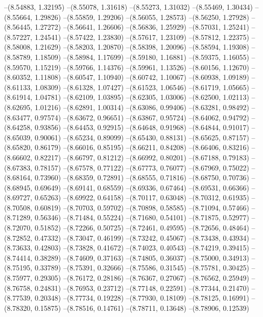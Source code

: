 --(8.54883, 1.32195)
--(8.55078, 1.31618)
--(8.55273, 1.31032)
--(8.55469, 1.30434)
--(8.55664, 1.29826)
--(8.55859, 1.29206)
--(8.56055, 1.28573)
--(8.56250, 1.27928)
--(8.56445, 1.27272)
--(8.56641, 1.26606)
--(8.56836, 1.25929)
--(8.57031, 1.25241)
--(8.57227, 1.24541)
--(8.57422, 1.23830)
--(8.57617, 1.23109)
--(8.57812, 1.22375)
--(8.58008, 1.21629)
--(8.58203, 1.20870)
--(8.58398, 1.20096)
--(8.58594, 1.19308)
--(8.58789, 1.18509)
--(8.58984, 1.17699)
--(8.59180, 1.16881)
--(8.59375, 1.16055)
--(8.59570, 1.15219)
--(8.59766, 1.14376)
--(8.59961, 1.13526)
--(8.60156, 1.12670)
--(8.60352, 1.11808)
--(8.60547, 1.10940)
--(8.60742, 1.10067)
--(8.60938, 1.09189)
--(8.61133, 1.08309)
--(8.61328, 1.07427)
--(8.61523, 1.06546)
--(8.61719, 1.05665)
--(8.61914, 1.04781)
--(8.62109, 1.03895)
--(8.62305, 1.03006)
--(8.62500, 1.02113)
--(8.62695, 1.01216)
--(8.62891, 1.00314)
--(8.63086, 0.99406)
--(8.63281, 0.98492)
--(8.63477, 0.97574)
--(8.63672, 0.96651)
--(8.63867, 0.95724)
--(8.64062, 0.94792)
--(8.64258, 0.93856)
--(8.64453, 0.92915)
--(8.64648, 0.91968)
--(8.64844, 0.91017)
--(8.65039, 0.90061)
--(8.65234, 0.89099)
--(8.65430, 0.88131)
--(8.65625, 0.87157)
--(8.65820, 0.86179)
--(8.66016, 0.85195)
--(8.66211, 0.84208)
--(8.66406, 0.83216)
--(8.66602, 0.82217)
--(8.66797, 0.81212)
--(8.66992, 0.80201)
--(8.67188, 0.79183)
--(8.67383, 0.78157)
--(8.67578, 0.77122)
--(8.67773, 0.76077)
--(8.67969, 0.75022)
--(8.68164, 0.73960)
--(8.68359, 0.72891)
--(8.68555, 0.71816)
--(8.68750, 0.70736)
--(8.68945, 0.69649)
--(8.69141, 0.68559)
--(8.69336, 0.67464)
--(8.69531, 0.66366)
--(8.69727, 0.65263)
--(8.69922, 0.64158)
--(8.70117, 0.63048)
--(8.70312, 0.61935)
--(8.70508, 0.60819)
--(8.70703, 0.59702)
--(8.70898, 0.58585)
--(8.71094, 0.57466)
--(8.71289, 0.56346)
--(8.71484, 0.55224)
--(8.71680, 0.54101)
--(8.71875, 0.52977)
--(8.72070, 0.51852)
--(8.72266, 0.50725)
--(8.72461, 0.49595)
--(8.72656, 0.48464)
--(8.72852, 0.47332)
--(8.73047, 0.46199)
--(8.73242, 0.45067)
--(8.73438, 0.43934)
--(8.73633, 0.42803)
--(8.73828, 0.41672)
--(8.74023, 0.40543)
--(8.74219, 0.39415)
--(8.74414, 0.38289)
--(8.74609, 0.37163)
--(8.74805, 0.36037)
--(8.75000, 0.34913)
--(8.75195, 0.33789)
--(8.75391, 0.32666)
--(8.75586, 0.31545)
--(8.75781, 0.30425)
--(8.75977, 0.29305)
--(8.76172, 0.28186)
--(8.76367, 0.27067)
--(8.76562, 0.25949)
--(8.76758, 0.24831)
--(8.76953, 0.23712)
--(8.77148, 0.22591)
--(8.77344, 0.21470)
--(8.77539, 0.20348)
--(8.77734, 0.19228)
--(8.77930, 0.18109)
--(8.78125, 0.16991)
--(8.78320, 0.15875)
--(8.78516, 0.14761)
--(8.78711, 0.13648)
--(8.78906, 0.12539)
